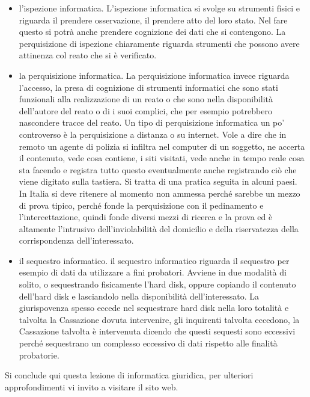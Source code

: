 \begin{itemize}
    \item l'ispezione informatica. L'ispezione informatica si svolge su strumenti fisici e riguarda il prendere osservazione, il prendere atto del loro stato. Nel fare questo si potrà anche prendere cognizione dei dati che si contengono. La perquisizione di ispezione chiaramente riguarda strumenti che possono avere attinenza col reato che si è verificato.
    \item la perquisizione informatica. La perquisizione informatica invece riguarda l'accesso, la presa di cognizione di strumenti informatici che sono stati funzionali alla realizzazione di un reato o che sono nella disponibilità dell'autore del reato o di i suoi complici, che per esempio potrebbero nascondere tracce del reato. Un tipo di perquisizione informatica un po' controverso è la perquisizione a distanza o su internet. Vole a dire che in remoto un agente di polizia si infiltra nel computer di un soggetto, ne accerta il contenuto, vede cosa contiene, i siti visitati, vede anche in tempo reale cosa sta facendo e registra tutto questo eventualmente anche registrando ciò che viene digitato sulla tastiera. Si tratta di una pratica seguita in alcuni paesi. In Italia si deve ritenere al momento non ammessa perché sarebbe un mezzo di prova tipico, perché fonde la perquisizione con il pedinamento e l'intercettazione, quindi fonde diversi mezzi di ricerca e la prova ed è altamente l'intrusivo dell'inviolabilità del domicilio e della riservatezza della corrispondenza dell'interessato.
    \item il sequestro informatico. il sequestro informatico riguarda il sequestro per esempio di dati da utilizzare a fini probatori. Avviene in due modalità di solito, o sequestrando fisicamente l'hard disk, oppure copiando il contenuto dell'hard disk e lasciandolo nella disponibilità dell'interessato. La giurispovenza spesso eccede nel sequestrare hard disk nella loro totalità e talvolta la Cassazione dovuta intervenire, gli inquirenti talvolta eccedono, la Cassazione talvolta è intervenuta dicendo che questi sequesti sono eccessivi perché sequestrano un complesso eccessivo di dati rispetto alle finalità probatorie.
\end{itemize}

Si conclude qui questa lezione di informatica giuridica, per ulteriori approfondimenti vi invito a visitare il sito web.
